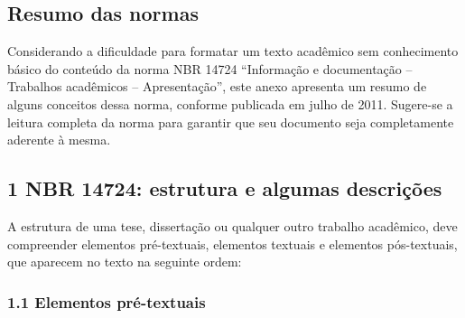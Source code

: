 \documentclass[
	12pt,				%
	oneside,			%
	a4paper,			%
	english,			%
	brazil				%
	]{abntex2ppgsi}
\begin{document}



\begin{anexosenv}



%
%
%
\chapter{Resumo das normas}
\label{anexoA}

Considerando a dificuldade para formatar um texto acadêmico sem conhecimento básico do conteúdo da norma NBR 14724 ``Informação e documentação – Trabalhos acadêmicos – Apresentação'', este anexo apresenta um resumo de alguns conceitos dessa norma, conforme publicada em julho de 2011. Sugere-se a leitura completa da norma para garantir que seu documento seja completamente aderente à mesma.

\section*{1 NBR 14724: estrutura e algumas descrições}

A estrutura de uma tese, dissertação ou qualquer outro trabalho acadêmico, deve compreender elementos pré-textuais, elementos textuais e elementos pós-textuais, que aparecem no texto na seguinte ordem:

\subsection*{1.1 Elementos pré-textuais}


\end{anexosenv}
\end{document}

